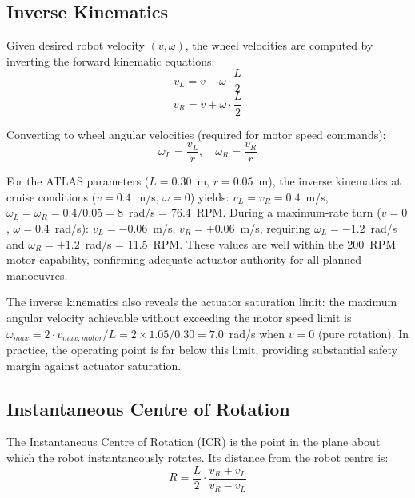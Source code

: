 \documentclass[12pt,a4paper,oneside]{report}
\begin{document}
\subsection{Inverse Kinematics}

Given desired robot velocity $(v, \omega)$, the wheel velocities are computed by inverting the forward kinematic equations:
\begin{equation}
v_L = v - \omega \cdot \frac{L}{2}
\label{eq:ik_left}
\end{equation}
\begin{equation}
v_R = v + \omega \cdot \frac{L}{2}
\label{eq:ik_right}
\end{equation}

Converting to wheel angular velocities (required for motor speed commands):
\begin{equation}
\omega_L = \frac{v_L}{r}, \quad \omega_R = \frac{v_R}{r}
\label{eq:wheel_angular}
\end{equation}

For the ATLAS parameters ($L = 0.30$~m, $r = 0.05$~m), the inverse kinematics at cruise conditions ($v = 0.4$~m/s, $\omega = 0$) yields: $v_L = v_R = 0.4$~m/s, $\omega_L = \omega_R = 0.4/0.05 = 8$~rad/s = 76.4~RPM. During a maximum-rate turn ($v = 0$, $\omega = 0.4$~rad/s): $v_L = -0.06$~m/s, $v_R = +0.06$~m/s, requiring $\omega_L = -1.2$~rad/s and $\omega_R = +1.2$~rad/s = 11.5~RPM. These values are well within the 200~RPM motor capability, confirming adequate actuator authority for all planned manoeuvres.

The inverse kinematics also reveals the actuator saturation limit: the maximum angular velocity achievable without exceeding the motor speed limit is $\omega_{max} = 2 \cdot v_{max,motor} / L = 2 \times 1.05 / 0.30 = 7.0$~rad/s when $v = 0$ (pure rotation). In practice, the operating point is far below this limit, providing substantial safety margin against actuator saturation.

\subsection{Instantaneous Centre of Rotation}

The Instantaneous Centre of Rotation (ICR) is the point in the plane about which the robot instantaneously rotates. Its distance from the robot centre is:
\begin{equation}
R = \frac{L}{2} \cdot \frac{v_R + v_L}{v_R - v_L}
\label{eq:icr}
\end{equation}
\end{document}
